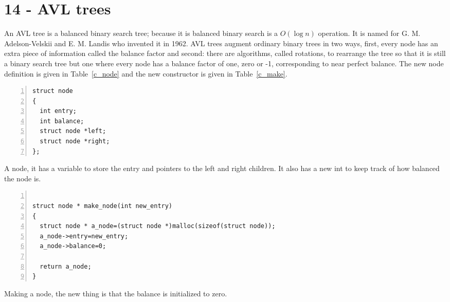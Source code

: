 \documentclass[11pt,a4paper]{scrartcl}
\begin{document}

\section*{14 - AVL trees}

An AVL tree is a balanced binary search tree; because it is balanced
binary search is a $O(\log{n})$ operation. It is named for
G. M. Adelson-Velskii and E. M. Landis who invented it in 1962. AVL
trees augment ordinary binary trees in two ways, first, every node has
an extra piece of information called the balance factor and second:
there are algorithms, called rotations, to rearrange the tree so that
it is still a binary search tree but one where every node has a
balance factor of one, zero or -1, corresponding to near perfect
balance. The new node definition is given in Table~\ref{c_node} and
the new constructor is given in Table~\ref{c_make}.

\begin{table}[b]
\begin{lstlisting}[numbers=left]
struct node
{
  int entry;
  int balance;
  struct node *left;
  struct node *right;
};
\end{lstlisting}
\caption{A node, it has a variable to store the entry and pointers to
  the left and right children. It also has a new int to keep track of
  how balanced the node is.\label{c_node}}
\end{table}


\begin{table}
\begin{lstlisting}[numbers=left]

struct node * make_node(int new_entry)
{
  struct node * a_node=(struct node *)malloc(sizeof(struct node));
  a_node->entry=new_entry;
  a_node->balance=0;

  return a_node;
}
\end{lstlisting}
\caption{Making a node, the new thing is that the balance is initialized to zero.\label{c_make}}
\end{table}
\end{document}

